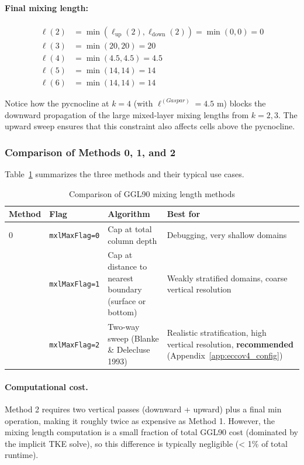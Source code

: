 \documentclass[12pt,letterpaper]{article}
\begin{document}
\paragraph{Final mixing length:}
\begin{align*}
\ell(2) &= \min(\ell_{\text{up}}(2), \ell_{\text{down}}(2)) = \min(0, 0) = 0 \\
\ell(3) &= \min(20, 20) = 20 \\
\ell(4) &= \min(4.5, 4.5) = 4.5 \\
\ell(5) &= \min(14, 14) = 14 \\
\ell(6) &= \min(14, 14) = 14
\end{align*}

Notice how the pycnocline at $k=4$ (with $\ell^{(Gaspar)} = 4.5$ m) blocks the downward propagation of the large mixed-layer mixing lengths from $k=2,3$. The upward sweep ensures that this constraint also affects cells above the pycnocline.

\subsubsection{Comparison of Methods 0, 1, and 2}

Table~\ref{tab:mxl_methods} summarizes the three methods and their typical use cases.

\begin{table}[ht]
\centering
\caption{Comparison of GGL90 mixing length methods}
\label{tab:mxl_methods}
\begin{tabular}{llp{5cm}p{4cm}}
\toprule
\textbf{Method} & \textbf{Flag} & \textbf{Algorithm} & \textbf{Best for} \\
\midrule
0 & \verb|mxlMaxFlag=0| & Cap at total column depth & Debugging, very shallow domains \\
\addlinespace
1 & \verb|mxlMaxFlag=1| & Cap at distance to nearest boundary (surface or bottom) & Weakly stratified domains, coarse vertical resolution \\
\addlinespace
2 & \verb|mxlMaxFlag=2| & Two-way sweep (Blanke \& Delecluse 1993) & Realistic stratification, high vertical resolution, \textbf{recommended} (Appendix~\ref{app:eccov4_config}) \\
\bottomrule
\end{tabular}
\end{table}

\paragraph{Computational cost.} Method 2 requires two vertical passes (downward + upward) plus a final min operation, making it roughly twice as expensive as Method 1. However, the mixing length computation is a small fraction of total GGL90 cost (dominated by the implicit TKE solve), so this difference is typically negligible (< 1\% of total runtime).
\end{document}
